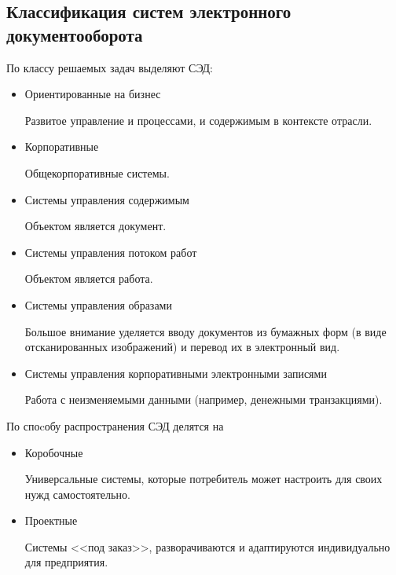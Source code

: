 \subsection{Классификация систем электронного документооборота} \label{review_classification}

По классу решаемых задач выделяют СЭД:
\begin{itemize}
	\item Ориентированные на бизнес

	Развитое управление и процессами, и содержимым в контексте отрасли.
	\item Корпоративные

	Общекорпоративные системы.
	\item Системы управления содержимым

	Объектом является документ.
	\item Системы управления потоком работ

	Объектом является работа.
	\item Системы управления образами

	Большое внимание уделяется вводу документов из бумажных форм (в виде отсканированных изображений) и перевод их в электронный вид.
	\item Системы управления корпоративными электронными записями

	Работа с неизменяемыми данными (например, денежными транзакциями).
\end{itemize}

По споcобу распространения СЭД делятся на
\begin{itemize}
	\item Коробочные

	Универсальные системы, которые потребитель может настроить для своих нужд самостоятельно.
	\item Проектные

	Системы <<под заказ>>, разворачиваются и адаптируются индивидуально для предприятия.
\end{itemize}